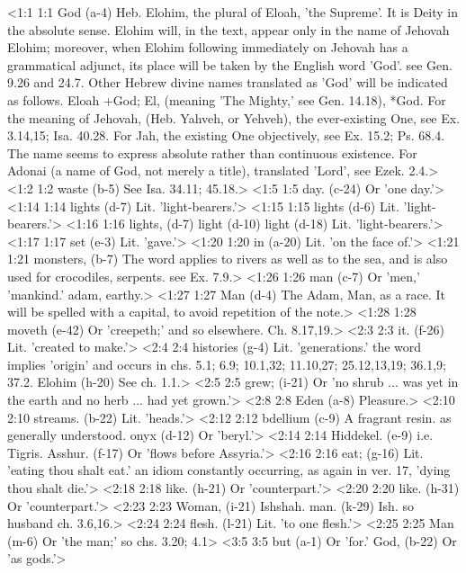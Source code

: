 <1:1 1:1  God (a-4)  Heb. Elohim, the plural of Eloah, 'the Supreme'. It is  Deity in the absolute sense. Elohim will, in the text, appear  only in the name of Jehovah Elohim; moreover, when Elohim  following immediately on Jehovah has a grammatical adjunct,  its place will be taken by the English word 'God'. see Gen.  9.26 and 24.7. Other Hebrew divine names translated as 'God'  will be indicated as follows. Eloah +God; El, (meaning 'The  Mighty,' see Gen. 14.18), *God. For the meaning of Jehovah,  (Heb. Yahveh, or Yehveh), the ever-existing One, see Ex.  3.14,15; Isa. 40.28. For Jah, the existing One objectively,  see Ex. 15.2; Ps. 68.4. The name seems to express absolute  rather than continuous existence. For Adonai (a name of  God, not merely a title), translated 'Lord', see Ezek. 2.4.>
<1:2 1:2  waste (b-5)  See Isa. 34.11; 45.18.>
<1:5 1:5  day. (c-24)  Or 'one day.'>
<1:14 1:14  lights (d-7) Lit. 'light-bearers.'>
<1:15 1:15  lights (d-6) Lit. 'light-bearers.'>
<1:16 1:16  lights, (d-7)  light (d-10)  light (d-18)
  Lit. 'light-bearers.'>
<1:17 1:17  set (e-3)  Lit. 'gave.'>
<1:20 1:20  in (a-20)  Lit. 'on the face of.'>
<1:21 1:21  monsters, (b-7)  The word applies to rivers as well as to the sea, and is also  used for crocodiles, serpents. see Ex. 7.9.>
<1:26 1:26  man (c-7)  Or 'men,' 'mankind.' adam, earthy.>
<1:27 1:27  Man (d-4)  The Adam, Man, as a race. It will be spelled with a  capital, to avoid repetition of the note.>
<1:28 1:28  moveth (e-42)  Or 'creepeth;' and so elsewhere. Ch. 8.17,19.>
<2:3 2:3  it. (f-26)  Lit. 'created to make.'>
<2:4 2:4  histories (g-4)  Lit. 'generations.' the word implies 'origin' and occurs in  chs. 5.1; 6.9; 10.1,32; 11.10,27; 25.12,13,19; 36.1,9; 37.2.
  Elohim (h-20)  See ch. 1.1.>
<2:5 2:5  grew; (i-21)  Or 'no shrub ... was yet in the earth and no herb ... had  yet grown.'>
<2:8 2:8  Eden (a-8)  Pleasure.>
<2:10 2:10  streams. (b-22)  Lit. 'heads.'>
<2:12 2:12  bdellium (c-9)  A fragrant resin. as generally understood.
  onyx (d-12)  Or 'beryl.'>
<2:14 2:14  Hiddekel. (e-9)  i.e. Tigris.
  Asshur. (f-17)  Or 'flows before Assyria.'>
<2:16 2:16  eat; (g-16)  Lit. 'eating thou shalt eat.' an idiom constantly occurring,  as again in ver. 17, 'dying thou shalt die.'>
<2:18 2:18  like. (h-21) Or 'counterpart.'>
<2:20 2:20  like. (h-31)  Or 'counterpart.'>
<2:23 2:23  Woman, (i-21)  Ishshah.
  man. (k-29)  Ish. so husband ch. 3.6,16.>
<2:24 2:24  flesh. (l-21)  Lit. 'to one flesh.'>
<2:25 2:25  Man (m-6)  Or 'the man;' so chs. 3.20; 4.1>
<3:5 3:5  but (a-1)  Or 'for.'
  God, (b-22)  Or 'as gods.'>
